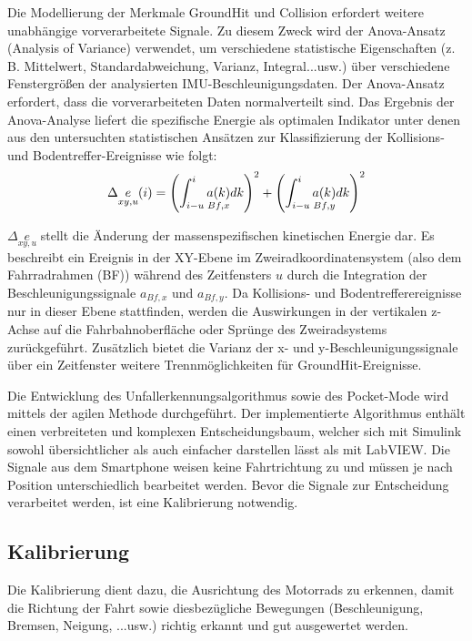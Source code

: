 Die Modellierung der Merkmale GroundHit und Collision erfordert weitere unabhängige vorverarbeitete Signale. Zu diesem Zweck wird der Anova-Ansatz (Analysis of Variance) verwendet, um verschiedene statistische Eigenschaften (z. B. Mittelwert, Standardabweichung, Varianz, Integral...usw.) über verschiedene Fenstergrößen der analysierten IMU-Beschleunigungsdaten. Der Anova-Ansatz erfordert, dass die vorverarbeiteten Daten normalverteilt sind. Das Ergebnis der Anova-Analyse liefert die spezifische Energie als optimalen Indikator unter denen aus den untersuchten statistischen Ansätzen zur Klassifizierung der Kollisions- und Bodentreffer-Ereignisse wie folgt:
\begin{equation}
	\centering
	\begin{gathered}
		\Delta\underset{xy,u}{e} (i) = \left(\int_{i-u}^{i} \underset{Bf,x}{a(k)} dk \right)^2 + \left(\int_{i-u}^{i} \underset{Bf,y}{a(k)} dk \right)^2
		\label{gl:EnergieFormel_JanPaper}
	\end{gathered}
\end{equation}


$\Delta\underset{xy,u}{e}$ stellt die Änderung der massenspezifischen kinetischen Energie dar. Es beschreibt ein Ereignis in der XY-Ebene im Zweiradkoordinatensystem (also dem Fahrradrahmen (BF)) während des Zeitfensters $u$ durch die Integration der Beschleunigungssignale $a_{Bf,x}$ und $a_{Bf,y}$. Da Kollisions- und Bodentrefferereignisse nur in dieser Ebene stattfinden, werden die Auswirkungen in der vertikalen z-Achse auf die Fahrbahnoberfläche oder Sprünge des Zweiradsystems zurückgeführt. Zusätzlich bietet die Varianz der x- und y-Beschleunigungssignale über ein Zeitfenster weitere Trennmöglichkeiten für GroundHit-Ereignisse. \citep{Schneeclassification2021}

Die Entwicklung des Unfallerkennungsalgorithmus sowie des Pocket-Mode wird mittels der agilen Methode durchgeführt. Der implementierte Algorithmus enthält einen verbreiteten und komplexen Entscheidungsbaum, welcher sich mit Simulink sowohl übersichtlicher als auch einfacher darstellen lässt als mit LabVIEW.
Die Signale aus dem Smartphone weisen keine Fahrtrichtung zu und müssen je nach Position unterschiedlich bearbeitet werden. Bevor die Signale zur Entscheidung verarbeitet werden, ist eine Kalibrierung notwendig.


\subsection{Kalibrierung}
Die Kalibrierung dient dazu, die Ausrichtung des Motorrads zu erkennen, damit die Richtung der Fahrt sowie diesbezügliche Bewegungen (Beschleunigung, Bremsen, Neigung, ...usw.) richtig erkannt und gut ausgewertet werden.\\

